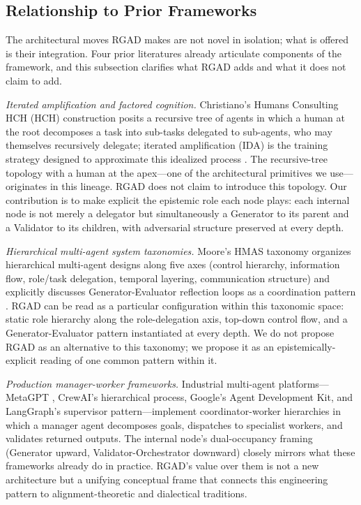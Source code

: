 \documentclass[11pt,a4paper]{article}
\begin{document}
\subsection{Relationship to Prior Frameworks}
The architectural moves RGAD makes are not novel in isolation; what is offered is their integration. Four prior literatures already articulate components of the framework, and this subsection clarifies what RGAD adds and what it does not claim to add.

\textit{Iterated amplification and factored cognition.} Christiano's Humans Consulting HCH (HCH) construction posits a recursive tree of agents in which a human at the root decomposes a task into sub-tasks delegated to sub-agents, who may themselves recursively delegate; iterated amplification (IDA) is the training strategy designed to approximate this idealized process \citep{christiano2018ida, christiano2016hch}. The recursive-tree topology with a human at the apex---one of the architectural primitives we use---originates in this lineage. RGAD does not claim to introduce this topology. Our contribution is to make explicit the epistemic role each node plays: each internal node is not merely a delegator but simultaneously a Generator to its parent and a Validator to its children, with adversarial structure preserved at every depth.

\textit{Hierarchical multi-agent system taxonomies.} Moore's HMAS taxonomy organizes hierarchical multi-agent designs along five axes (control hierarchy, information flow, role/task delegation, temporal layering, communication structure) and explicitly discusses Generator-Evaluator reflection loops as a coordination pattern \citep{moore2025}. RGAD can be read as a particular configuration within this taxonomic space: static role hierarchy along the role-delegation axis, top-down control flow, and a Generator-Evaluator pattern instantiated at every depth. We do not propose RGAD as an alternative to this taxonomy; we propose it as an epistemically-explicit reading of one common pattern within it.

\textit{Production manager-worker frameworks.} Industrial multi-agent platforms---MetaGPT \citep{hong2024metagpt}, CrewAI's hierarchical process, Google's Agent Development Kit, and LangGraph's supervisor pattern---implement coordinator-worker hierarchies in which a manager agent decomposes goals, dispatches to specialist workers, and validates returned outputs. The internal node's dual-occupancy framing (Generator upward, Validator-Orchestrator downward) closely mirrors what these frameworks already do in practice. RGAD's value over them is not a new architecture but a unifying conceptual frame that connects this engineering pattern to alignment-theoretic and dialectical traditions.
\end{document}

